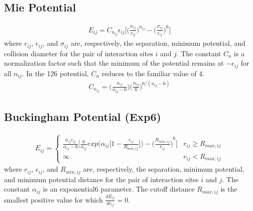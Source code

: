 \documentclass[letterpaper,10pt,english]{sphinxmanual}
\begin{document}
\subsection{Mie Potential}
\label{\detokenize{input_file:mie-potential}}\begin{equation*}
\begin{split}E_{ij} = C_{n_{ij}} \epsilon_{ij} \bigg[\bigg(\frac{\sigma_{ij}}{r_{ij}}\bigg)^{n_{ij}} - \bigg(\frac{\sigma_{ij}}{r_{ij}}\bigg)^6\bigg]\end{split}
\end{equation*}
where \(r_{ij}\), \(\epsilon_{ij}\), and \(\sigma_{ij}\) are, respectively, the separation, minimum potential, and collision diameter for the pair of interaction sites \(i\) and \(j\). The constant \(C_n\) is a normalization factor such that the minimum of the potential remains at \(-\epsilon_{ij}\) for all \(n_{ij}\). In the 12\sphinxhyphen{}6 potential, \(C_n\) reduces to the familiar value of 4.
\begin{equation*}
\begin{split}C_{n_{ij}} = \bigg(\frac{n_{ij}}{n_{ij} - 6} \bigg)\bigg(\frac{n_{ij}}{6} \bigg)^{6/(n_{ij} - 6)}\end{split}
\end{equation*}

\subsection{Buckingham Potential (Exp\sphinxhyphen{}6)}
\label{\detokenize{input_file:buckingham-potential-exp-6}}\begin{equation*}
\begin{split}E_{ij} =
\begin{cases}
  \frac{\alpha_{ij}\epsilon_{ij}}{\alpha_{ij}-6} \bigg[\frac{6}{\alpha_{ij}} exp\bigg(\alpha_{ij} \bigg[1-\frac{r_{ij}}{R_{min,ij}} \bigg]\bigg) - {\bigg(\frac{R_{min,ij}}{r_{ij}}\bigg)}^6 \bigg] &  r_{ij} \geq R_{max,ij} \\
  \infty & r_{ij} < R_{max,ij}
\end{cases}\end{split}
\end{equation*}
where \(r_{ij}\), \(\epsilon_{ij}\), and \(R_{min,ij}\) are, respectively, the separation, minimum potential, and minimum potential distance for the pair of interaction sites \(i\) and \(j\).
The constant \(\alpha_{ij}\) is an  exponential\sphinxhyphen{}6 parameter. The cutoff distance \(R_{max,ij}\) is the smallest positive value for which \(\frac{dE_{ij}}{dr_{ij}}=0\).
\end{document}
